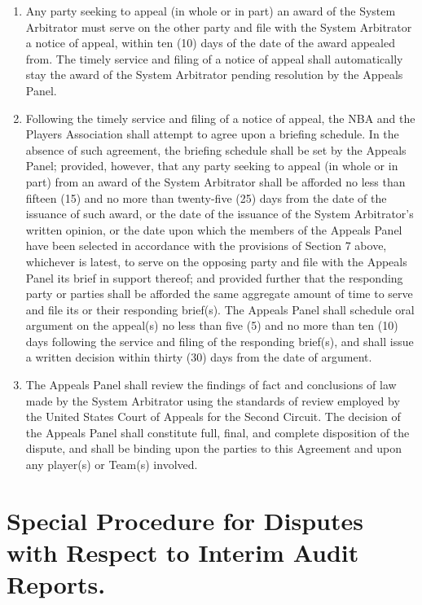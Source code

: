 \documentclass[
]{book}
\providecommand{\tightlist}{%
  \setlength{\itemsep}{0pt}\setlength{\parskip}{0pt}}
\begin{document}
\begin{enumerate}
\def\labelenumi{(\alph{enumi})}
\tightlist
\item
  Any party seeking to appeal (in whole or in part) an award of the System Arbitrator must serve on the other party and file with the System Arbitrator a notice of appeal, within ten (10) days of the date of the award appealed from. The timely service and filing of a notice of appeal shall automatically stay the award of the System Arbitrator pending resolution by the Appeals Panel.
\item
  Following the timely service and filing of a notice of appeal, the NBA and the Players Association shall attempt to agree upon a briefing schedule. In the absence of such agreement, the briefing schedule shall be set by the Appeals Panel; provided, however, that any party seeking to appeal (in whole or in part) from an award of the System Arbitrator shall be afforded no less than fifteen (15) and no more than twenty-five (25) days from the date of the issuance of such award, or the date of the issuance of the System Arbitrator's written opinion, or the date upon which the members of the Appeals Panel have been selected in accordance with the provisions of Section 7 above, whichever is latest, to serve on the opposing party and file with the Appeals Panel its brief in support thereof; and provided further that the responding party or parties shall be afforded the same aggregate amount of time to serve and file its or their responding brief(s). The Appeals Panel shall schedule oral argument on the appeal(s) no less than five (5) and no more than ten (10) days following the service and filing of the responding brief(s), and shall issue a written decision within thirty (30) days from the date of argument.
\item
  The Appeals Panel shall review the findings of fact and conclusions of law made by the System Arbitrator using the standards of review employed by the United States Court of Appeals for the Second Circuit. The decision of the Appeals Panel shall constitute full, final, and complete disposition of the dispute, and shall be binding upon the parties to this Agreement and upon any player(s) or Team(s) involved.
\end{enumerate}

\hypertarget{special-procedure-for-disputes-with-respect-to-interim-audit-reports.}{%
\section{Special Procedure for Disputes with Respect to Interim Audit Reports.}\label{special-procedure-for-disputes-with-respect-to-interim-audit-reports.}}
\end{document}
